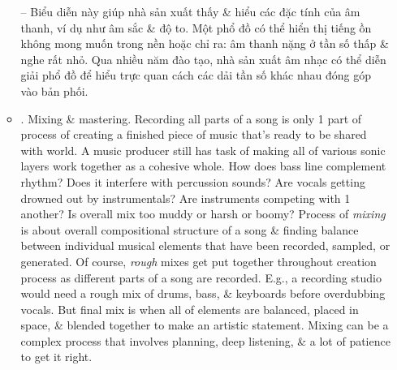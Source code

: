 \documentclass{article}
\begin{document}
\begin{itemize}
\begin{itemize}
		-- Biểu diễn này giúp nhà sản xuất thấy \& hiểu các đặc tính của âm thanh, ví dụ như âm sắc \& độ to. Một phổ đồ có thể hiển thị tiếng ồn không mong muốn trong nền hoặc chỉ ra: âm thanh nặng ở tần số thấp \& nghe rất nhỏ. Qua nhiều năm đào tạo, nhà sản xuất âm nhạc có thể diễn giải phổ đồ để hiểu trực quan cách các dải tần số khác nhau đóng góp vào bản phối.
		\item {. Mixing \& mastering.} Recording all parts of a song is only 1 part of process of creating a finished piece of music that's ready to be shared with world. A music producer still has task of making all of various sonic layers work together as a cohesive whole. How does bass line complement rhythm? Does it interfere with percussion sounds? Are vocals getting drowned out by instrumentals? Are instruments competing with 1 another? Is overall mix too muddy or harsh or boomy? Process of {\it mixing} is about overall compositional structure of a song \& finding balance between individual musical elements that have been recorded, sampled, or generated. Of course, {\it rough} mixes get put together throughout creation process as different parts of a song are recorded. E.g., a recording studio would need a rough mix of drums, bass, \& keyboards before overdubbing vocals. But final mix is when all of elements are balanced, placed in space, \& blended together to make an artistic statement. Mixing can be a complex process that involves planning, deep listening, \& a lot of patience to get it right.


\end{itemize}
\end{itemize}
\end{document}
